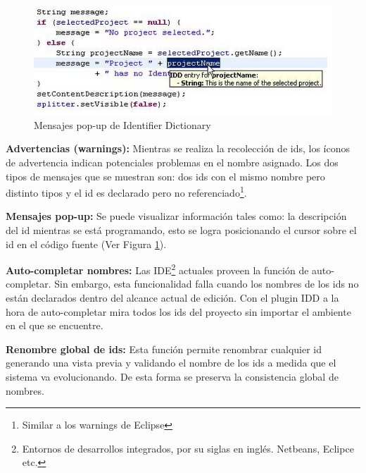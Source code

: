 \begin{figure}[t] %
\centerline{%
\includegraphics[scale= 0.70]{./cap3/idd_7.png}
}
\caption{Mensajes pop-up de Identifier Dictionary}
\label{captura8}
\end{figure}

\textbf{Advertencias (warnings):} Mientras se realiza la recolección de ids, los íconos de advertencia indican potenciales problemas en el nombre asignado.  Los dos tipos de mensajes que se muestran son: dos ids con el mismo nombre pero distinto tipos y el id es declarado pero no referenciado\footnote[1]{Similar a los warnings de Eclipse}.


\textbf{Mensajes pop-up:} Se puede visualizar información tales como: la descripción del id mientras se está programando, esto se logra posicionando el cursor sobre el id en el código fuente (Ver Figura \ref{captura8}).

\textbf{Auto-completar nombres:} Las IDE\footnote[2]{Entornos de desarrollos integrados, por su siglas en inglés. Netbeans, Eclipce etc.} actuales proveen la función de auto-completar.
Sin embargo, esta funcionalidad falla cuando los nombres de los ids no están declarados dentro del alcance actual de edición. Con el plugin IDD a la hora de auto-completar mira todos los ids del proyecto sin importar el ambiente en el que se encuentre.

\textbf{Renombre global de ids:} Esta función permite renombrar cualquier id generando una vista previa y validando el nombre de los ids a medida que el sistema va evolucionando. De esta forma se preserva la consistencia global de nombres.

